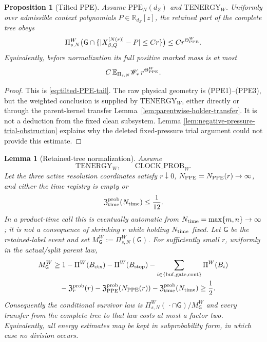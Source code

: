 \documentclass[11pt]{article}
\newtheorem{proposition}[theorem]{Proposition}
\newtheorem{lemma}[theorem]{Lemma}
\begin{document}
\begin{proposition}[Tilted PPE]
\label{prop:physical-legal-child}
Assume $\mathrm{PPE}_{N}(d_Z)$ and $\mathrm{TENERGY}_{W}$.  Uniformly over
admissible context polynomials $P\in\mathbb R_{d_Z}[z]$, the retained part of
the complete tree obeys
\begin{equation}
\label{eq:local-clean-sublevel}
 \Pi_{s,N}^{W}
 \bigl(\mathsf G\cap\{|X^{[N(r)]}_{\beta,Q}-P|\le Cr\}\bigr)
 \le Cr^{\Theta_{\rm PPE}^{W}}.
\end{equation}
Equivalently, before normalization its full positive marked mass is at most
\[
 C\,\mathbb E_{\Pi_{s,N}}\mathscr W_*\,r^{\Theta_{\rm PPE}^{W}}.
\]
\end{proposition}

\begin{proof}
This is \eqref{eq:tilted-PPE-tail}.  The raw physical geometry is
\textup{(PPE1)--(PPE3)}, but the weighted conclusion is supplied by
$\mathrm{TENERGY}_{W}$, either directly or through the parent-kernel
transfer Lemma~\ref{lem:parentwise-holder-transfer}.  It is not a deduction from the
fixed clean subsystem.  Lemma
\ref{lem:negative-pressure-trial-obstruction} explains why the deleted
fixed-pressure trial argument could not provide this estimate.
\end{proof}

\begin{lemma}[Retained-tree normalization]
\label{lem:retained-tree-normalization}
Assume
\[
 \mathrm{TENERGY}_{W},\qquad \mathrm{CLOCK\_PROB}_{W}.
\]
Let the three active resolution coordinates
satisfy $r\downarrow0$, $N_{\rm PPE}=N_{\rm PPE}(r)\to\infty$, and either
the time registry is empty or
\begin{equation}
\label{eq:time-survivor-explicit-smallness}
 \mathfrak Z_{\rm time}^{\rm prob}(N_{\rm time})\le\frac1{12}.
\end{equation}
In a product-time call this is eventually automatic from
$N_{\rm time}=\max\{m,n\}\to\infty$; it is not a consequence of shrinking
$r$ while holding $N_{\rm time}$ fixed.
Let $\mathsf G$ be the retained-label event and set
$M_{\mathsf G}^{W}:=\Pi_{s,N}^{W}(\mathsf G)$.  For sufficiently small $r$,
uniformly in the actual/split parent law,
\begin{equation}
\label{eq:survivor-mass-lower-bound}
\begin{aligned}
 M_{\mathsf G}^{W}&\ge
  1-\Pi^W(B_{\rm ctx})-\Pi^W(B_{\rm stop})
   -\sum_{i\in\{\rm buf,gate,cont\}}\Pi^W(B_i)\\
 &\quad-\mathfrak Z_r^{\rm prob}(r)
   -\mathfrak Z_{\rm PPE}^{\rm prob}(N_{\rm PPE}(r))
   -\mathfrak Z_{\rm time}^{\rm prob}(N_{\rm time})
 \ge\frac12.
\end{aligned}
\end{equation}
Consequently the conditional survivor law is
$\Pi_{s,N}^{W}(\,\cdot\cap\mathsf G)/M_{\mathsf G}^{W}$ and every transfer
from the complete tree to that law costs at most a factor two.  Equivalently,
all energy estimates may be kept in subprobability form, in which case no
division occurs.
\end{lemma}
\end{document}

